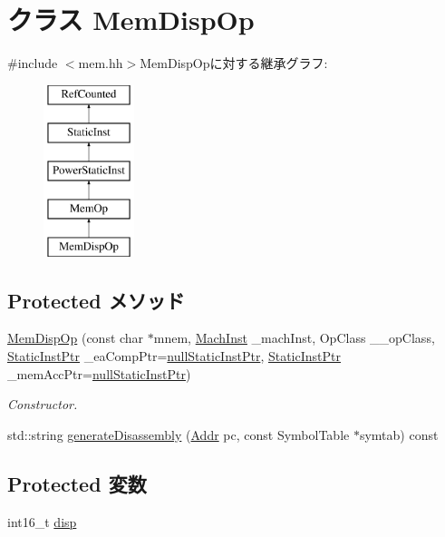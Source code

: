 \hypertarget{classPowerISA_1_1MemDispOp}{
\section{クラス MemDispOp}
\label{classPowerISA_1_1MemDispOp}
}


{\ttfamily \#include $<$mem.hh$>$}MemDispOpに対する継承グラフ:\begin{figure}[H]
\begin{center}
\leavevmode
\includegraphics[height=5cm]{classPowerISA_1_1MemDispOp}
\end{center}
\end{figure}
\subsection*{Protected メソッド}
\begin{DoxyCompactItemize}
\item 
\hyperlink{classPowerISA_1_1MemDispOp_a2f30799c8ef4128f768bf7b737638ac2}{MemDispOp} (const char $\ast$mnem, \hyperlink{namespacePowerISA_a301c22ea09fa33dcfe6ddf22f203699c}{MachInst} \_\-machInst, OpClass \_\-\_\-opClass, \hyperlink{classRefCountingPtr}{StaticInstPtr} \_\-eaCompPtr=\hyperlink{classStaticInst_aa793d9793af735f09096369fb17567b6}{nullStaticInstPtr}, \hyperlink{classRefCountingPtr}{StaticInstPtr} \_\-memAccPtr=\hyperlink{classStaticInst_aa793d9793af735f09096369fb17567b6}{nullStaticInstPtr})
\begin{DoxyCompactList}\small\item\em Constructor. \item\end{DoxyCompactList}\item 
std::string \hyperlink{classPowerISA_1_1MemDispOp_a95d323a22a5f07e14d6b4c9385a91896}{generateDisassembly} (\hyperlink{base_2types_8hh_af1bb03d6a4ee096394a6749f0a169232}{Addr} pc, const SymbolTable $\ast$symtab) const 
\end{DoxyCompactItemize}
\subsection*{Protected 変数}
\begin{DoxyCompactItemize}
\item 
int16\_\-t \hyperlink{classPowerISA_1_1MemDispOp_a0bf57a15d1f3322678bf01a87b20a11b}{disp}
\end{DoxyCompactItemize}


